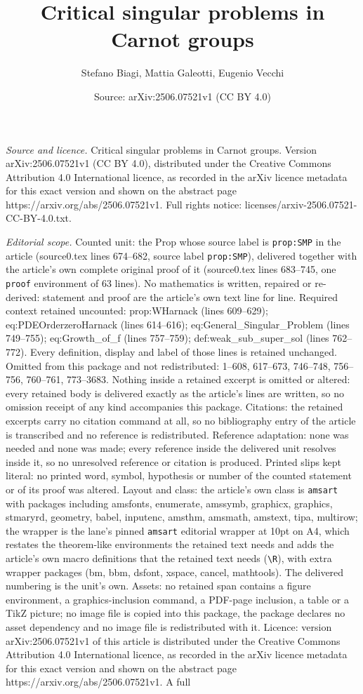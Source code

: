 \documentclass[10pt,a4paper]{amsart}
\title[Critical singular problems in Carnot groups]{Critical singular problems in Carnot groups}
\author{Stefano Biagi, Mattia Galeotti, Eugenio Vecchi}
\date{Source: arXiv:2506.07521v1 (CC BY 4.0)}
\begin{document}
\maketitle

\noindent\emph{Source and licence.} Critical singular problems in Carnot groups. Version arXiv:2506.07521v1 (CC BY 4.0), distributed under the Creative Commons Attribution 4.0 International licence, as recorded in the arXiv licence metadata for this exact version and shown on the abstract page https://arxiv.org/abs/2506.07521v1. Full rights notice: licenses/arxiv-2506.07521-CC-BY-4.0.txt.\par\smallskip

\noindent\textit{Editorial scope.} Counted unit: the Prop whose source label is \texttt{prop:SMP} in the article (source0.tex lines 674--682, source label \texttt{prop:SMP}), delivered together with the article's own complete original proof of it (source0.tex lines 683--745, one \texttt{proof} environment of 63 lines). No mathematics is written, repaired or re-derived: statement and proof are the article's own text line for line. Required context retained uncounted: prop:WHarnack (lines 609--629); eq:PDEOrderzeroHarnack (lines 614--616); eq:General\_Singular\_Problem (lines 749--755); eq:Growth\_of\_f (lines 757--759); def:weak\_sub\_super\_sol (lines 762--772). Every definition, display and label of those lines is retained unchanged. Omitted from this package and not redistributed: 1--608, 617--673, 746--748, 756--756, 760--761, 773--3683. Nothing inside a retained excerpt is omitted or altered: every retained body is delivered exactly as the article's lines are written, so no omission receipt of any kind accompanies this package. Citations: the retained excerpts carry no citation command at all, so no bibliography entry of the article is transcribed and no reference is redistributed. Reference adaptation: none was needed and none was made; every reference inside the delivered unit resolves inside it, so no unresolved reference or citation is produced. Printed slips kept literal: no printed word, symbol, hypothesis or number of the counted statement or of its proof was altered. Layout and class: the article's own class is \texttt{amsart} with packages including amsfonts, enumerate, amssymb, graphicx, graphics, stmaryrd, geometry, babel, inputenc, amsthm, amsmath, amstext, tipa, multirow; the wrapper is the lane's pinned \texttt{amsart} editorial wrapper at 10pt on A4, which restates the theorem-like environments the retained text needs and adds the article's own macro definitions that the retained text needs (\texttt{\textbackslash R}), with extra wrapper packages (bm, bbm, dsfont, xspace, cancel, mathtools). The delivered numbering is the unit's own. Assets: no retained span contains a figure environment, a graphics-inclusion command, a PDF-page inclusion, a table or a TikZ picture; no image file is copied into this package, the package declares no asset dependency and no image file is redistributed with it. Licence: version arXiv:2506.07521v1 of this article is distributed under the Creative Commons Attribution 4.0 International licence, as recorded in the arXiv licence metadata for this exact version and shown on the abstract page https://arxiv.org/abs/2506.07521v1. A full 
\end{document}
